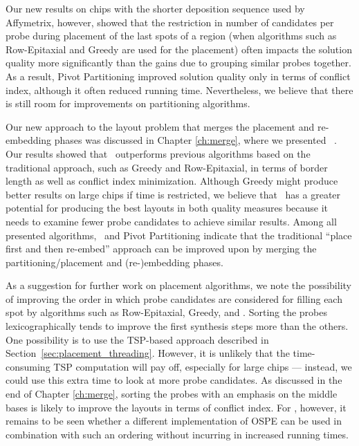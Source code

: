 Our new results on chips with the shorter deposition sequence used by
Affymetrix, however, showed that the restriction in number of candidates per
probe during placement of the last spots of a region (when algorithms such as
Row-Epitaxial and Greedy are used for the placement) often impacts the solution
quality more significantly than the gains due to grouping similar probes
together. As a result, Pivot Partitioning improved solution quality only in
terms of conflict index, although it often reduced running time. Nevertheless,
we believe that there is still room for improvements on partitioning algorithms.

Our new approach to the layout problem that merges the placement and
re-embedding phases was discussed in Chapter \ref{ch:merge}, where we presented
\Greedyplus\ \citep{Carvalho2007}. Our results showed that \Greedyplus\
outperforms previous algorithms based on the traditional approach, such as
Greedy and Row-Epitaxial, in terms of border length as well as conflict index
minimization. Although Greedy might produce better results on large chips if
time is restricted, we believe that \Greedyplus\ has a greater potential for
producing the best layouts in both quality measures because it needs to examine
fewer probe candidates to achieve similar results. Among all presented
algorithms, \Greedyplus\ and Pivot Partitioning indicate that the
traditional ``place first and then re-embed'' approach can be improved upon by
merging the partitioning/placement and (re-)embedding phases.

As a suggestion for further work on placement algorithms, we note the
possibility of improving the order in which probe candidates are considered for
filling each spot by algorithms such as Row-Epitaxial, Greedy, and \Greedyplus.
Sorting the probes lexicographically tends to improve the first synthesis steps
more than the others. One possibility is to use the TSP-based approach described
in Section~\ref{sec:placement_threading}. However, it is unlikely that the
time-consuming TSP computation will pay off, especially for large chips ---
instead, we could use this extra time to look at more probe candidates. As
discussed in the end of Chapter \ref{ch:merge}, sorting the probes with an
emphasis on the middle bases is likely to improve the layouts in terms of
conflict index. For \Greedyplus, however, it remains to be seen whether a
different implementation of OSPE can be used in combination with such an
ordering without incurring in increased running times.

